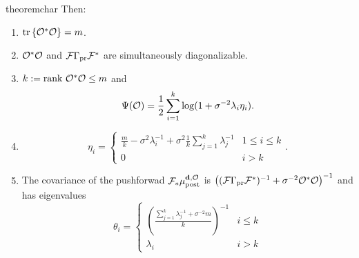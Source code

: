 \begin{restatable}{theorem}{char}
  Then:
  \begin{enumerate}
  \item  $\textup{tr}\left \{\mathcal{O}^*\mathcal{O} \right \} = m$.
  \item $\mathcal{O}^*\mathcal{O}$ and $\mathcal{F}\Gamma_{\textup{pr}}\mathcal{F}^*$ are simultaneously
    diagonalizable.
  \item $k := \textup{rank}\  \mathcal{O}^*\mathcal{O} \leq m$ and
    \begin{equation*}
      \tar(\obs) = \frac12 \sum_{i=1}^{k} \log (1 + \sigma^{-2}\lambda_i\eta_i). %
    \end{equation*}
  \item
    \begin{equation*}
        \eta_i = \begin{cases}
          \frac{m}{k} - \sigma^2 \lambda_i^{-1} + \sigma^2 \frac{1}{k} \sum_{j=1}^k \lambda_j^{-1} & 1 \leq i \leq k \\
          0 & i > k 
        \end{cases}.
    \end{equation*}
  \item The covariance of the pushforwad $\mathcal{F}_{*} \mu_{\textup{post}}^{\mathbf{d}, \mathcal{O}}$ is $\left (
    (\mathcal{F} \Gamma_{\textup{pr}} \mathcal{F}^*)^{-1} + \sigma^{-2} \mathcal{O}^*\mathcal{O} \right )^{-1}$
    and has eigenvalues
    \begin{equation*}
      \theta_i =
      \begin{cases}
        \left(\frac{\sum_{j=1}^k \lambda_j^{-1} + \sigma^{-2}m}{k} \right )^{-1} & i \leq k \\
        \lambda_i &  i > k 
      \end{cases}
    \end{equation*}
  \end{enumerate}
\end{restatable}


